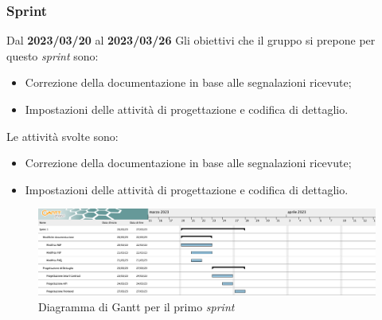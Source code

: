 \subsubsection{ Sprint}
Dal \textbf{2023/03/20} al \textbf{2023/03/26}
\newline
Gli obiettivi che il gruppo si prepone per questo \textit{sprint} sono:
\begin{itemize}
    \item Correzione della documentazione in base alle segnalazioni ricevute;
    \item Impostazioni delle attività di progettazione e codifica di dettaglio.
\end{itemize}
Le attività svolte sono:
\begin{itemize}
    \item Correzione della documentazione in base alle segnalazioni ricevute;
    \item Impostazioni delle attività di progettazione e codifica di dettaglio.
\end{itemize}
\begin{figure}[H]
    \centering
    \includegraphics[width=\textwidth]{src/img/GanttSprint1.png}
    \caption{Diagramma di Gantt per il primo \textit{sprint}}
\end{figure}
